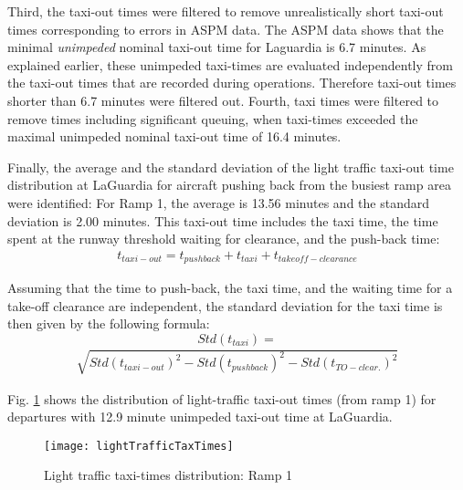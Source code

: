 \documentclass[letterpaper]{article}
\begin{document}
\indent Third, the taxi-out times were filtered to remove unrealistically short taxi-out times corresponding to errors in ASPM data.
 The ASPM data shows that the minimal \emph{unimpeded} nominal taxi-out time for Laguardia is 6.7 minutes. As explained earlier, 
 these unimpeded taxi-times are evaluated independently from the taxi-out times that are recorded during operations. Therefore taxi-out times shorter than 6.7 minutes
  were filtered out.
 \indent Fourth, taxi times were filtered to remove times including significant queuing, when taxi-times exceeded the maximal unimpeded nominal
  taxi-out time of 16.4 minutes.



\indent Finally, the average and the standard deviation of the light traffic taxi-out time distribution at LaGuardia for aircraft pushing back from the busiest ramp area were identified: For Ramp 1, the average is 13.56 minutes and the standard deviation is 2.00 minutes. This taxi-out time includes the taxi time, the time spent at the runway threshold waiting for clearance, and the push-back time:
\begin{eqnarray}
  \label{taxiav}
t_{taxi-out} = t_{pushback}+t_{taxi}+t_{takeoff-clearance}
\end{eqnarray}

Assuming that the time to push-back, the taxi time, and the waiting time for a take-off clearance are independent, the standard deviation for the taxi time is then given by the following formula:
$$Std(t_{taxi}) = $$
\begin{eqnarray}
  \label{taxistd}
\sqrt{Std(t_{taxi-out})^{2}-Std(t_{pushback})^{2}-Std(t_{TO-clear.})^{2}}
\end{eqnarray}

Fig. \ref{lightTrafficTaxTimesSelection} shows the distribution of light-traffic taxi-out times (from ramp 1) for departures with 12.9 minute unimpeded taxi-out time at LaGuardia.

\begin{figure}[ht]
\centering
\texttt{[image: lightTrafficTaxTimes]}
\caption{Light traffic taxi-times distribution: Ramp 1}
\label{lightTrafficTaxTimesSelection}
\end{figure}
\end{document}
